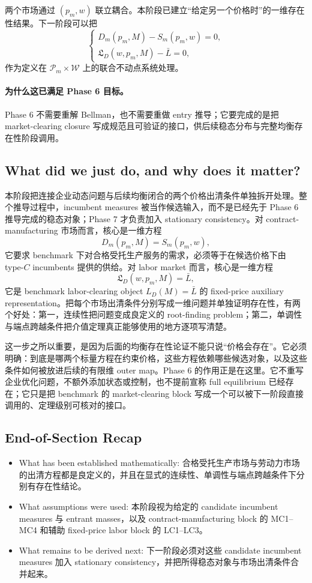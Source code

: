 两个市场通过 $(p_m,w)$ 联立耦合。本阶段已建立“给定另一个价格时”的一维存在性结果。下一阶段可以把
\[
\begin{cases}
D_m(p_m,M)-S_m(p_m,w)=0,\\
\mathfrak L_D(w,p_m,M)-\bar L=0,
\end{cases}
\]
作为定义在 $\mathcal P_m\times\mathcal W$ 上的联合不动点系统处理。

\paragraph{为什么这已满足 Phase 6 目标。}
Phase 6 不需要重解 Bellman，也不需要重做 entry 推导；它要完成的是把 market-clearing closure 写成规范且可验证的接口，供后续稳态分布与完整均衡存在性阶段调用。

\subsection{What did we just do, and why does it matter?}

本阶段把连接企业动态问题与后续均衡闭合的两个价格出清条件单独拆开处理。整个推导过程中，incumbent measures 被当作候选输入，而不是已经先于 Phase 6 推导完成的稳态对象；Phase 7 才负责加入 stationary consistency。对 contract-manufacturing 市场而言，核心是一维方程
\[
D_m(p_m,M)=S_m(p_m,w),
\]
它要求 benchmark 下对合格受托生产服务的需求，必须等于在候选价格下由 type-$C$ incumbents 提供的供给。对 labor market 而言，核心是一维方程
\[
\mathfrak L_D(w,p_m,M)=\bar L,
\]
它是 benchmark labor-clearing object $L_D(M)=\bar L$ 的 fixed-price auxiliary representation。把每个市场出清条件分别写成一维问题并单独证明存在性，有两个好处：第一，连续性把问题变成良定义的 root-finding problem；第二，单调性与端点跨越条件把介值定理真正能够使用的地方逐项写清楚。

这一步之所以重要，是因为后面的均衡存在性论证不能只说“价格会存在”。它必须明确：到底是哪两个标量方程在约束价格，这些方程依赖哪些候选对象，以及这些条件如何被放进后续的有限维 outer map。Phase 6 的作用正是在这里。它不重写企业优化问题，不额外添加状态或控制，也不提前宣称 full equilibrium 已经存在；它只是把 benchmark 的 market-clearing block 写成一个可以被下一阶段直接调用的、定理级别可核对的接口。

\subsection*{End-of-Section Recap}

\begin{itemize}
    \item What has been established mathematically: 合格受托生产市场与劳动力市场的出清方程都是良定义的，并且在显式的连续性、单调性与端点跨越条件下分别有存在性结论。
    \item What assumptions were used: 本阶段视为给定的 candidate incumbent measures 与 entrant masses，以及 contract-manufacturing block 的 MC1--MC4 和辅助 fixed-price labor block 的 LC1--LC3。
    \item What remains to be derived next: 下一阶段必须对这些 candidate incumbent measures 加入 stationary consistency，并把所得稳态对象与市场出清条件合并起来。
\end{itemize}
